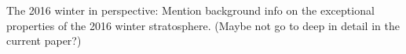 The 2016 winter in perspective: 
Mention background info on the exceptional properties of the 2016 winter stratosphere. (Maybe not go to deep in detail in the current paper?)